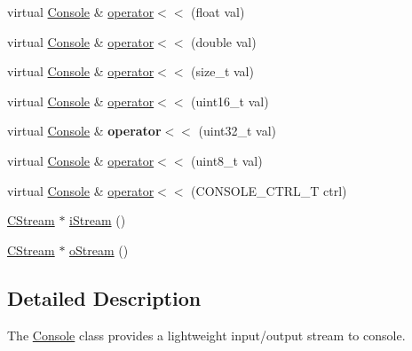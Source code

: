 \begin{DoxyCompactItemize}
virtual \hyperlink{class_console}{Console} \& \hyperlink{class_console_adaabaa6205705e13193e472a4cf7f194}{operator$<$$<$} (float val)
\item 
virtual \hyperlink{class_console}{Console} \& \hyperlink{class_console_ab765a1b1954e26b2cb725dc49c35fdeb}{operator$<$$<$} (double val)
\item 
virtual \hyperlink{class_console}{Console} \& \hyperlink{class_console_a756e1e290f184491bf98dfaa1247fff7}{operator$<$$<$} (size\-\_\-t val)
\item 
virtual \hyperlink{class_console}{Console} \& \hyperlink{class_console_a1da129a9f12eff89f82fc694bdc59231}{operator$<$$<$} (uint16\-\_\-t val)
\item 
\hypertarget{class_console_ad2d3cf94e3a31436681cc0839b760a75}{virtual \hyperlink{class_console}{Console} \& {\bfseries operator$<$$<$} (uint32\-\_\-t val)}\label{class_console_ad2d3cf94e3a31436681cc0839b760a75}

\item 
virtual \hyperlink{class_console}{Console} \& \hyperlink{class_console_a0b13c2318c5e62763b679c190223de54}{operator$<$$<$} (uint8\-\_\-t val)
\item 
virtual \hyperlink{class_console}{Console} \& \hyperlink{class_console_aed5d1ad55ac69f1173f610d7c75793a6}{operator$<$$<$} (C\-O\-N\-S\-O\-L\-E\-\_\-\-C\-T\-R\-L\-\_\-\-T ctrl)
\item 
\hyperlink{class_c_stream}{C\-Stream} $\ast$ \hyperlink{class_console_ad4d21815c5cbc33e9015ba5babf5bf09}{i\-Stream} ()
\item 
\hyperlink{class_c_stream}{C\-Stream} $\ast$ \hyperlink{class_console_af6941f3b8ce87a9e53f58c5a74936d49}{o\-Stream} ()
\end{DoxyCompactItemize}


\subsection{Detailed Description}
The \hyperlink{class_console}{Console} class provides a lightweight input/output stream to console. 


